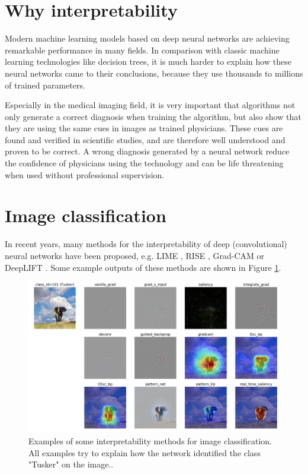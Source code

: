 \section{Why interpretability}
Modern machine learning models based on deep neural networks are achieving remarkable performance in many fields. In comparison with classic machine learning technologies like decision trees, it is much harder to explain how these neural networks came to their conclusions, because they use thousands to millions of trained parameters.

Especially in the medical imaging field, it is very important that algorithms not only generate a correct diagnosis when training the algorithm, but also show that they are using the same cues in images as trained physicians. These cues are found and verified in scientific studies, and are therefore well understood and proven to be correct. A wrong diagnosis generated by a neural network reduce the confidence of physicians using the technology and can be life threatening when used without professional supervision.

\section{Image classification}
In recent years, many methods for the interpretability of deep (convolutional) neural networks have been proposed, e.g. LIME \cite{ribeiro2016should}, RISE \cite{Petsiuk2018rise}, Grad-CAM \cite{selvaraju2017grad} or DeepLIFT \cite{shrikumar2017learning}. Some example outputs of these methods are shown in Figure \ref{classification_methods}.

\begin{figure}[h]
\centering
\includegraphics[width=14cm]{images/tusker_saliency.png}
\caption{Examples of some interpretability methods for image classification. All examples try to explain how the network identified the class "Tusker" on the image.. \cite{visualattribution}}
\label{classification_methods}
\end{figure}


